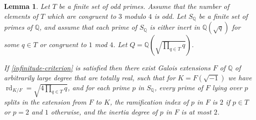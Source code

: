 \documentclass[12pt]{amsart}
\newtheorem{lemma}[theo]{Lemma}
\theoremstyle{remark}
\theoremstyle{definition}
\begin{document}
\begin{lemma}\label{field-existence} Let $T$ be a finite set of odd primes. Assume that the number of elements of $T$ which are congruent to $3$ modulo $4$ is odd. Let $S_{\mathbb Q}$ be a finite set of primes of $\mathbb Q$, and assume that each prime of $S_{\mathbb Q}$ is either inert in $\mathbb Q(\sqrt{q})$ for some $q\in T$ or congruent to $1$ mod $4$. Let $Q=\mathbb Q(\sqrt{\prod_{q\in T} q})$.

If \eqref{infinitude-criterion} is satisfied then there exist Galois extensions $F$ of $\mathbb Q$ of arbitrarily large degree that are totally real, such that for $K = F(\sqrt{-1})$ we have $\operatorname{rd}_{K/F} = \sqrt{ 4 \prod_{q\in T} q}$, and for each prime $p$ in $S_{\mathbb Q}$, every prime of $F$ lying over $p$ splits in the extension from $F$ to $K$, the ramification index of $p$ in $F$ is $2$ if $p\in T$ or $p=2$ and $1$ otherwise, and the inertia degree of $p$ in $F$ is at most $2$. \end{lemma}
 
\end{document}
